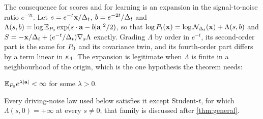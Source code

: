 The consequence for scores and for learning is an expansion in the signal-to-noise
ratio $e^{-2t}$. Let $s=e^{-t}\mathbf{x}/\Delta_t$, $b=e^{-2t}/\Delta_t$ and
$\Lambda(s,b)=\log\mathbb{E}_{P_0}\exp(s\cdot\mathbf{a}-b|\mathbf{a}|^2/2)$, so that
$\log P_t(\mathbf{x})=\log\mathcal{N}_{\Delta_t}(\mathbf{x})+\Lambda(s,b)$ and
$S=-\mathbf{x}/\Delta_t+(e^{-t}/\Delta_t)\nabla_s\Lambda$ exactly. Grading $\Lambda$ by order in
$e^{-t}$, its second-order part is the same for $P_0$ and its covariance twin, and its
fourth-order part differs by a term linear in $\kappa_4$. The expansion is legitimate when
$\Lambda$ is finite in a neighbourhood of the origin, which is the one hypothesis the
theorem needs:
\begin{assumption}
\label{ass:exp}
$\mathbb{E}_{P_0}e^{\lambda|\mathbf{a}|}<\infty$ for some $\lambda>0$.
\end{assumption}
Every driving-noise law used below satisfies it except Student-$t$, for which
$\Lambda(s,0)=+\infty$ at every $s\neq0$; that family is discussed after
\cref{thm:general}.

